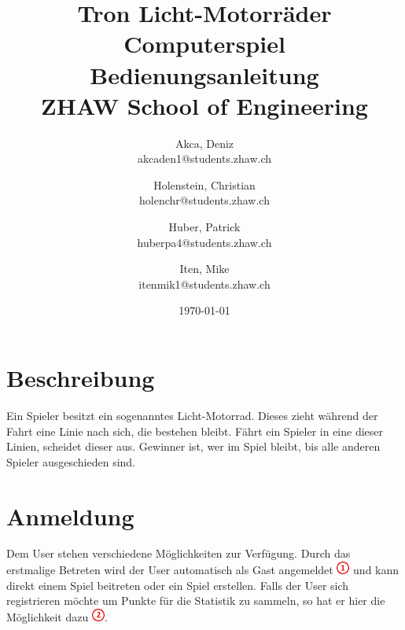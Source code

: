 \documentclass[11pt,ngerman]{article}
\begin{document}
    \title{Tron Licht-Motorräder Computerspiel\\
        \vspace{1cm}
        Bedienungsanleitung \\
        \vspace{0.5cm}
        \small{}ZHAW  School of Engineering
        \vspace{1.5cm}
    }
    \author{
        Akca, Deniz\\
        \small{akcaden1@students.zhaw.ch}
        \and
        Holenstein, Christian\\
        \small{holenchr@students.zhaw.ch}
        \and
        Huber, Patrick\\
        \small{huberpa4@students.zhaw.ch}
        \and
        Iten, Mike\\
        \small{itenmik1@students.zhaw.ch}
        \vspace{1.5cm}
    }
   \date{\today}

    \maketitle
    \newpage

    \tableofcontents
	\listoffigures
    \newpage
    
    \section{Beschreibung}
    
    Ein Spieler besitzt ein sogenanntes Licht-Motorrad. Dieses zieht während der Fahrt eine Linie nach sich, die bestehen bleibt. Fährt ein Spieler in eine dieser Linien, scheidet dieser aus. Gewinner ist, wer im Spiel bleibt, bis alle anderen Spieler ausgeschieden sind.
    
    \section{Anmeldung}
    
    Dem User stehen verschiedene Möglichkeiten zur Verfügung. Durch das erstmalige Betreten wird der User automatisch als Gast angemeldet \includegraphics{figures/1.png} und kann direkt einem Spiel beitreten oder ein Spiel erstellen. 
    Falls der User sich registrieren möchte um Punkte für die Statistik zu sammeln, so hat er hier die Möglichkeit dazu \includegraphics{figures/2.png}. 
    
\end{document}
